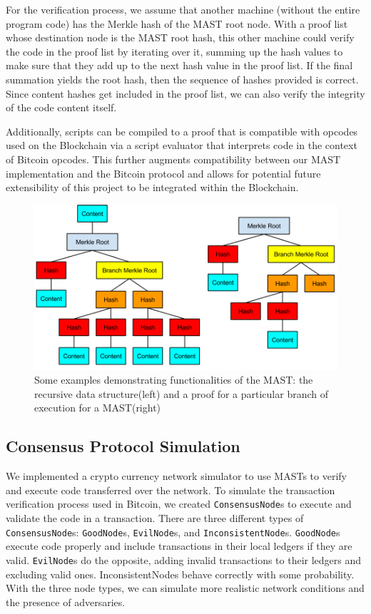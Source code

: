\documentclass{vldb}
\begin{document}
For the verification process, we assume that another machine (without the entire program code) has the Merkle hash of the MAST root node. With a proof list whose destination node is the MAST root hash, this other machine could verify the code in the proof list by iterating over it, summing up the hash values to make sure that they add up to the next hash value in the proof list. If the final summation yields the root hash, then the sequence of hashes provided is correct. Since content hashes get included in the proof list, we can also verify the integrity of the code content itself.

Additionally, scripts can be compiled to a proof that is compatible with opcodes used on the Blockchain via a script evaluator that interprets code in the context of Bitcoin opcodes. This further augments compatibility between our MAST implementation and the Bitcoin protocol and allows for potential future extensibility of this project to be integrated within the Blockchain.

\begin{figure}[h]
	\includegraphics[scale=.35]{mast}
	\caption{Some examples demonstrating functionalities of  the MAST: the recursive data structure(left) and a proof for a particular branch of execution for a MAST(right)}
	\label{mast}
\end{figure}

\subsection{Consensus Protocol Simulation}

We implemented a crypto currency network simulator to use MASTs to verify and execute code transferred over the network. To simulate the transaction verification process used in Bitcoin, we created \texttt{ConsensusNode}s to execute and validate the code in a transaction. There are three different types of \texttt{ConsensusNode}s: \texttt{GoodNode}s, \texttt{EvilNode}s, and \texttt{InconsistentNode}s. \texttt{GoodNode}s execute code properly and include transactions in their local ledgers if they are valid. \texttt{EvilNode}s do the opposite, adding invalid transactions to their ledgers and excluding valid ones. InconsistentNodes behave correctly with some probability. With the three node types, we can simulate more realistic network conditions and the presence of adversaries.
\end{document}
